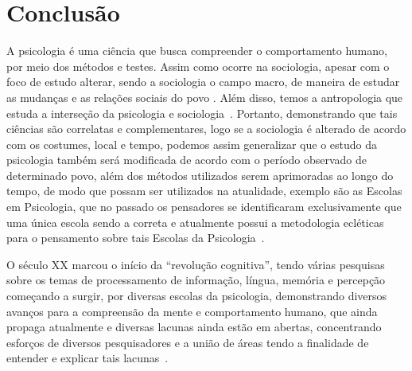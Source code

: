 \section{Conclusão}\label{conclusao}

A psicologia é uma ciência que busca compreender o comportamento humano, por meio dos métodos e testes.
Assim como ocorre na sociologia, apesar com o foco de estudo alterar, sendo a sociologia o campo macro, de maneira de estudar as mudanças e as relações sociais do povo \cite{quintaneiro2003toque}.
Além disso, temos a antropologia que estuda a interseção da psicologia e sociologia~\cite{castro2016antropologia}.
Portanto, demonstrando que tais ciências são correlatas e complementares, logo se a sociologia é alterado de acordo com os costumes, local e tempo, podemos assim generalizar que o estudo da psicologia também será modificada de acordo com o período observado de determinado povo, além dos métodos utilizados serem aprimoradas ao longo do tempo, de modo que possam ser utilizados na atualidade, exemplo são as Escolas em Psicologia, que no passado os pensadores se identificaram exclusivamente que uma única escola sendo a correta e atualmente possui a metodologia ecléticas para o pensamento sobre tais Escolas da Psicologia~\cite{spink2011psicologia_social}.

O século XX marcou o início da ``revolução cognitiva'', tendo várias pesquisas sobre os temas de processamento de informação, língua, memória e percepção começando a surgir, por diversas escolas da psicologia, demonstrando diversos avanços para a compreensão da mente e comportamento humano, que ainda propaga atualmente e diversas lacunas ainda estão em abertas, concentrando esforços de diversos pesquisadores e a união de áreas tendo a finalidade de entender e explicar tais lacunas~\cite{sternberg2000psicologia,eysenck2017psi_cognitiva}.
